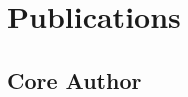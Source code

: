 

\section{Publications}


\subsection{Core Author}

\newrefcontext[sorting=ydnt]
\begin{refsection}
    \nocite{*}
    \printbibliography[heading=none, keyword={primary}]
\end{refsection}







